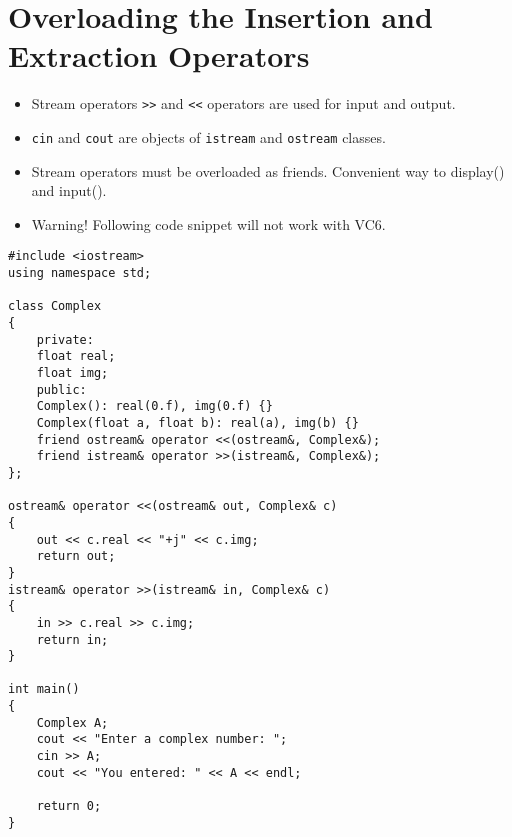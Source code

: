 \documentclass[12pt,a4paper]{article}
\begin{document}
\section{Overloading the Insertion and Extraction Operators}
\begin{itemize}
\item Stream operators \verb|>>| and \verb|<<| operators are used for input and output.
\item \verb|cin| and \verb|cout| are objects of \verb|istream| and \verb|ostream| classes.
\item Stream operators must be overloaded as friends. Convenient way to display() and input().
\item Warning! Following code snippet will not work with VC6.
\end{itemize}
\begin{lstlisting}[caption={Overloading Stream Operators for Complex class}]
#include <iostream>
using namespace std;

class Complex
{
	private:
	float real;
	float img;
	public:
	Complex(): real(0.f), img(0.f) {}
	Complex(float a, float b): real(a), img(b) {}
	friend ostream& operator <<(ostream&, Complex&);
	friend istream& operator >>(istream&, Complex&);
};

ostream& operator <<(ostream& out, Complex& c)
{
	out << c.real << "+j" << c.img;
	return out;
}
istream& operator >>(istream& in, Complex& c)
{
	in >> c.real >> c.img;
	return in;
}

int main()
{
	Complex A;
	cout << "Enter a complex number: ";
	cin >> A;
	cout << "You entered: " << A << endl;

	return 0;
}
\end{lstlisting}


\end{document}
